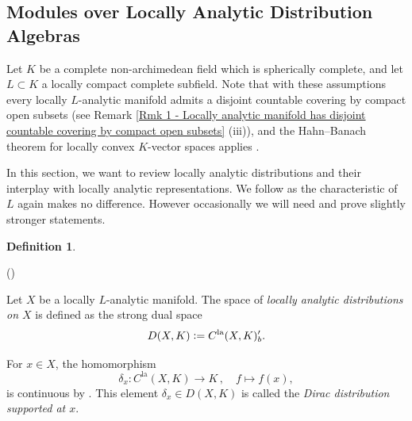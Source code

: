 \documentclass[a4paper, reqno, 10pt]{amsart}
\theoremstyle{definition}
\newtheorem{definition}[theorem]{Definition}
\newenvironment{altenumerate}
	{\begin{list}
		{\textup{(\theenumi)} }
		{\usecounter{enumi}
			\setlength{\labelwidth}{0pt}
			\setlength{\labelsep}{0pt}
			\setlength{\leftmargin}{0pt}
			\setlength{\itemsep}{0pt}
			\setlength{\topsep}{0pt}
		\renewcommand{\theenumi}{\roman{enumi}}
		}}
	{\end{list}}
\numberwithin{equation}{section}
\newcommand{\defeq}{\vcentcolon=}
\newcommand{\la}{{\mathrm{la}}}
\newcommand{\lra}{\longrightarrow}
\newcommand{\lto}{\longmapsto}
\begin{document}
\subsection{Modules over Locally Analytic Distribution Algebras}


Let $K$ be a complete non-ar\-chi\-me\-de\-an field which is spherically complete, and let $L\subset K$ a locally compact complete subfield.
Note that with these assumptions every locally $L$-analytic manifold admits a disjoint countable covering by compact open subsets (see  Remark \ref{Rmk 1 - Locally analytic manifold has disjoint countable covering by compact open subsets} (iii)), and the Hahn--Banach theorem for locally convex $K$-vector spaces applies \cite[Prop.\ 9.2]{Schneider02NonArchFunctAna}.

In this section, we want to review locally analytic distributions and their interplay with locally analytic representations.
We follow \cite{SchneiderTeitelbaum02LocAnDistApplToGL2} as the characteristic of $L$ again makes no difference.
However occasionally we will need and prove slightly stronger statements.



\begin{definition}
	\begin{altenumerate}
		\item
		Let $X$ be a locally $L$-analytic manifold.
		The space of \textit{locally analytic distributions on $X$} is defined as the strong dual space
		\[D(X,K) \defeq C^\la (X,K)'_b .\]
		
		\item
		For $x\in X$, the homomorphism
		\[\delta_x \colon C^\la (X,K) \lra K\,,\quad f \lto f(x),\]
		is continuous by .
		This element $\delta_x \in D(X,K)$ is called the \textit{Dirac distribution supported at $x$}.
	\end{altenumerate}
\end{definition}
\end{document}
